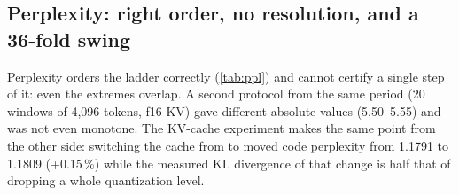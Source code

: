 \subsection{Perplexity: right order, no resolution, and a 36-fold swing}\label{sec:ppl}

\begin{table}[t]
\centering\small
\caption{WikiText-2 perplexity\hist, Protocol~1: 602 windows of 512 tokens, scoring the second half of
each window with the first half as context; $\pm$ is the tool's standard error. The whole ladder spans
0.033 while each point carries $\pm0.041$.}\label{tab:ppl}
\end{table}

Perplexity orders the ladder correctly (\cref{tab:ppl}) and cannot certify a single step of it: even
the extremes overlap. A second protocol from the same period (20 windows of 4{,}096 tokens, f16 KV)
gave different absolute values (5.50--5.55) and was not even monotone. The KV-cache experiment makes
the same point from the other side: switching the cache from  to  moved code
perplexity from 1.1791 to 1.1809 (+0.15\,\%) while the measured KL divergence of that change is half
that of dropping a whole quantization level.

